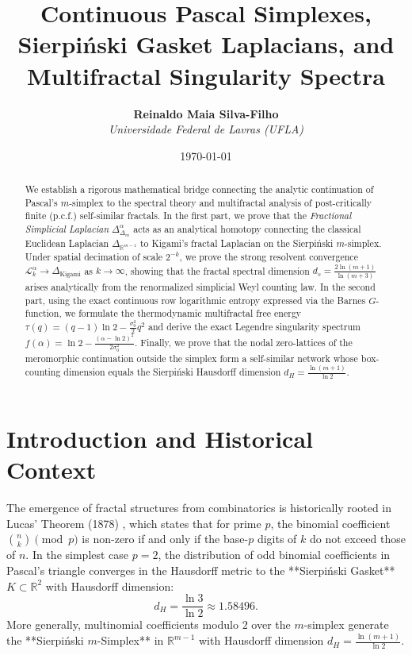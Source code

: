 \documentclass[11pt,a4paper]{article}
\title{\textbf{Continuous Pascal Simplexes, Sierpi\'nski Gasket Laplacians, and Multifractal Singularity Spectra}}
\author{\textbf{Reinaldo Maia Silva-Filho} \\ \textit{Universidade Federal de Lavras (UFLA)}}
\date{\today}
\theoremstyle{plain}
\theoremstyle{definition}
\theoremstyle{remark}
\numberwithin{equation}{section}
\begin{document}
\maketitle

\begin{abstract}
We establish a rigorous mathematical bridge connecting the analytic continuation of Pascal's $m$-simplex to the spectral theory and multifractal analysis of post-critically finite (p.c.f.) self-similar fractals. In the first part, we prove that the \emph{Fractional Simplicial Laplacian} $\Delta_{\Delta_m}^\alpha$ acts as an analytical homotopy connecting the classical Euclidean Laplacian $\Delta_{\mathbb{R}^{m-1}}$ to Kigami's fractal Laplacian on the Sierpi\'nski $m$-simplex. Under spatial decimation of scale $2^{-k}$, we prove the strong resolvent convergence $\mathcal{L}_k^\alpha \to \Delta_{\text{Kigami}}$ as $k \to \infty$, showing that the fractal spectral dimension $d_s = \frac{2\ln(m+1)}{\ln(m+3)}$ arises analytically from the renormalized simplicial Weyl counting law. In the second part, using the exact continuous row logarithmic entropy expressed via the Barnes $G$-function, we formulate the thermodynamic multifractal free energy $\tau(q) = (q-1)\ln 2 - \frac{\sigma_0^2}{2}q^2$ and derive the exact Legendre singularity spectrum $f(\alpha) = \ln 2 - \frac{(\alpha - \ln 2)^2}{2\sigma_0^2}$. Finally, we prove that the nodal zero-lattices of the meromorphic continuation outside the simplex form a self-similar network whose box-counting dimension equals the Sierpi\'nski Hausdorff dimension $d_H = \frac{\ln(m+1)}{\ln 2}$.
\end{abstract}

\tableofcontents
\newpage

\section{Introduction and Historical Context}

The emergence of fractal structures from combinatorics is historically rooted in Lucas' Theorem (1878) \cite{lucas1878}, which states that for prime $p$, the binomial coefficient $\binom{n}{k} \pmod p$ is non-zero if and only if the base-$p$ digits of $k$ do not exceed those of $n$. In the simplest case $p=2$, the distribution of odd binomial coefficients in Pascal's triangle converges in the Hausdorff metric to the **Sierpi\'nski Gasket** $K \subset \mathbb{R}^2$ with Hausdorff dimension:
\begin{equation}
d_H = \frac{\ln 3}{\ln 2} \approx 1.58496.
\end{equation}
More generally, multinomial coefficients modulo $2$ over the $m$-simplex generate the **Sierpi\'nski $m$-Simplex** in $\mathbb{R}^{m-1}$ with Hausdorff dimension $d_H = \frac{\ln(m+1)}{\ln 2}$.
\end{document}
